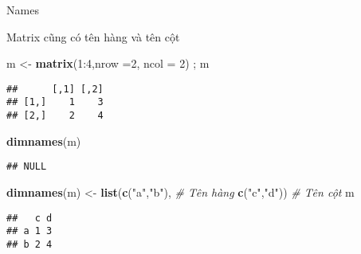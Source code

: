\documentclass[
  ignorenonframetext,
]{beamer}
\newenvironment{Shaded}{}{}
\newcommand{\CommentTok}[1]{\textcolor[rgb]{0.38,0.63,0.69}{\textit{#1}}}
\newcommand{\DataTypeTok}[1]{\textcolor[rgb]{0.56,0.13,0.00}{#1}}
\newcommand{\DecValTok}[1]{\textcolor[rgb]{0.25,0.63,0.44}{#1}}
\newcommand{\KeywordTok}[1]{\textcolor[rgb]{0.00,0.44,0.13}{\textbf{#1}}}
\newcommand{\NormalTok}[1]{#1}
\newcommand{\OperatorTok}[1]{\textcolor[rgb]{0.40,0.40,0.40}{#1}}
\newcommand{\StringTok}[1]{\textcolor[rgb]{0.25,0.44,0.63}{#1}}
\begin{document}
\begin{frame}[fragile]{Names}
\protect\hypertarget{names-3}{}

Matrix cũng có tên hàng và tên cột

\begin{Shaded}
\begin{Highlighting}[]
\NormalTok{m <-}\StringTok{ }\KeywordTok{matrix}\NormalTok{(}\DecValTok{1}\OperatorTok{:}\DecValTok{4}\NormalTok{,}\DataTypeTok{nrow =}\DecValTok{2}\NormalTok{, }\DataTypeTok{ncol =} \DecValTok{2}\NormalTok{) ; m}
\end{Highlighting}
\end{Shaded}

\begin{verbatim}
##      [,1] [,2]
## [1,]    1    3
## [2,]    2    4
\end{verbatim}

\begin{Shaded}
\begin{Highlighting}[]
\KeywordTok{dimnames}\NormalTok{(m)}
\end{Highlighting}
\end{Shaded}

\begin{verbatim}
## NULL
\end{verbatim}

\begin{Shaded}
\begin{Highlighting}[]
\KeywordTok{dimnames}\NormalTok{(m) <-}\StringTok{ }\KeywordTok{list}\NormalTok{(}\KeywordTok{c}\NormalTok{(}\StringTok{"a"}\NormalTok{,}\StringTok{"b"}\NormalTok{),             }\CommentTok{# Tên hàng}
                    \KeywordTok{c}\NormalTok{(}\StringTok{"c"}\NormalTok{,}\StringTok{"d"}\NormalTok{))             }\CommentTok{# Tên cột}
\NormalTok{m}
\end{Highlighting}
\end{Shaded}

\begin{verbatim}
##   c d
## a 1 3
## b 2 4
\end{verbatim}

\end{frame}
\end{document}
